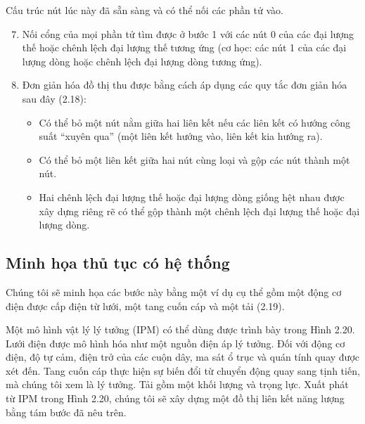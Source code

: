 Cấu trúc nút lúc này đã sẵn sàng và có thể nối các phần tử vào.
\begin{enumerate}
\setcounter{enumi}{6}
\item Nối cổng của mọi phần tử tìm được ở bước 1 với các nút 0 của các đại lượng thế hoặc chênh lệch đại lượng thế tương ứng (cơ học: các nút 1 của các đại lượng dòng hoặc chênh lệch đại lượng dòng tương ứng).
\item Đơn giản hóa đồ thị thu được bằng cách áp dụng các quy tắc đơn giản hóa sau đây (2.18):
\begin{itemize}
\item Có thể bỏ một nút nằm giữa hai liên kết nếu các liên kết có hướng công suất ``xuyên qua'' (một liên kết hướng vào, liên kết kia hướng ra).
\item Có thể bỏ một liên kết giữa hai nút cùng loại và gộp các nút thành một nút.
\item Hai chênh lệch đại lượng thế hoặc đại lượng dòng giống hệt nhau được xây dựng riêng rẽ có thể gộp thành một chênh lệch đại lượng thế hoặc đại lượng dòng.
\end{itemize}
\end{enumerate}
\clearpage

\subsection{Minh họa thủ tục có hệ thống}
Chúng tôi sẽ minh họa các bước này bằng một ví dụ cụ thể gồm một động cơ điện được cấp điện từ lưới, một tang cuốn cáp và một tải (2.19).

Một mô hình vật lý lý tưởng (IPM) có thể dùng được trình bày trong Hình 2.20. Lưới điện được mô hình hóa như một nguồn điện áp lý tưởng. Đối với động cơ điện, độ tự cảm, điện trở của các cuộn dây, ma sát ổ trục và quán tính quay được xét đến. Tang cuốn cáp thực hiện sự biến đổi từ chuyển động quay sang tịnh tiến, mà chúng tôi xem là lý tưởng. Tải gồm một khối lượng và trọng lực. Xuất phát từ IPM trong Hình 2.20, chúng tôi sẽ xây dựng một đồ thị liên kết năng lượng bằng tám bước đã nêu trên.


